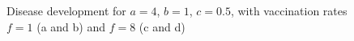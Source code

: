 \begin{figure}
    \caption{Disease development for $a=4$, $b=1$, $c=0.5$, with vaccination rates $f=1$ (a and b) and $f=8$ (c and d)}
    \label{fig:latevacc}
\end{figure}


